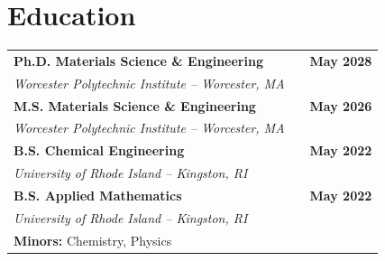 \documentclass{article}
\begin{document}
\section{Education}
\begin{tabularx}{0.97\textwidth}{@{} l X r @{}}
\textbf{Ph.D. Materials Science \& Engineering} & & \textbf{May 2028}\\
\textit{Worcester Polytechnic Institute -- Worcester, MA} & & \\
\textbf{M.S. Materials Science \& Engineering} & &  \textbf{May 2026} \\
\textit{Worcester Polytechnic Institute -- Worcester, MA} & &  \\
\textbf{B.S. Chemical Engineering} & & \textbf{May 2022}\\
\textit{University of Rhode Island -- Kingston, RI} & & \\
\textbf{B.S. Applied Mathematics} & & \textbf{May 2022}\\
\textit{University of Rhode Island -- Kingston, RI} & & \\
\textbf{Minors:} Chemistry, Physics & & 
\end{tabularx}
%
%
\end{document}
